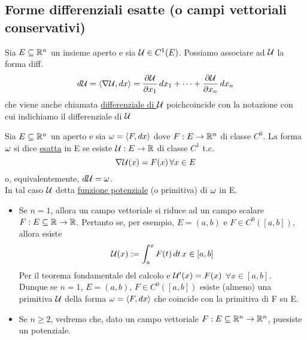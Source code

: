 \subsection{Forme differenziali esatte (o campi vettoriali conservativi)}
Sia $E\subseteq\mathbb{R}^n$ un insieme aperto e sia $\mathcal{U} \in C^1(E)$. Possiamo associare ad $\mathcal{U}$
la forma diff. 
$$d\mathcal{U} = \left\langle \nabla\mathcal{U},dx \right\rangle = \frac{\partial \mathcal{U}}{\partial x_1}\,dx_1+\dots+\frac{\partial \mathcal{U}}{\partial x_n}\,dx_n$$
che viene anche chiamata \underline{differenziale di $\mathcal{U}$} poich\ace coincide con la notazione
con cui indichiamo il differenziale di $\mathcal{U}$
\begin{definition}
  Sia $E\subseteq\mathbb{R}^n$ un aperto e sia $\omega = \left\langle F,dx \right\rangle$ dove
  $F:E\to\mathbb{R}^n$ di classe $C^0$. La forma $\omega$ si dice \underline{esatta} in E 
  se esiste $\mathcal{U}:E\to\mathbb{R}$ di classe $C^1$ t.c.
  $$\nabla\mathcal{U}(x) = F(x) \, \forall x \in E$$
  o, equivalentemente, $d\mathcal{U} = \omega$.\\
  In tal caso $\mathcal{U}$ \ace detta \underline{funzione potenziale} (o primitiva) di $\omega$ in E.
\end{definition}
\begin{osservazione}
  \begin{itemize}
    \item Se $n=1$, allora un campo vettoriale si riduce ad un campo scalare $F:E\subseteq\mathbb{R}\to\mathbb{R}$. Pertanto
          se, per esempio, $E=(a,b)$ e $F\in C^0([a,b])$, allora esiste 
          $$\mathcal{U}(x):= \int_{a}^{x} F(t)\,dt \, x \in [a,b]$$
          Per il teorema fondamentale del calcolo e $\mathcal{U}'(x) = F(x)$ $\forall x \in [a,b]$. \\
          Dunque se $n=1$, $E = (a,b)$, $F \in C^0([a,b])$ esiste (almeno) una primitiva
          $\mathcal{U}$ della forma $\omega = \left\langle F,dx \right\rangle$ che coincide con la primitiva di F su E.
    \item Se $n\geq 2$, vedremo che, dato un campo vettoriale $F:E\subseteq \mathbb{R}^n \to \mathbb{R}^n$, pu\aco esiste un potenziale.
  \end{itemize}
\end{osservazione}

